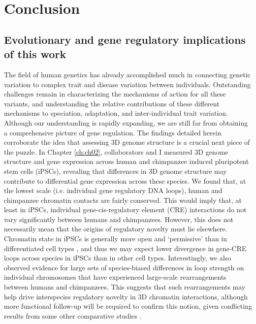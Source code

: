 \chapter{Conclusion}\label{ch:ch04}

\section{Evolutionary and gene regulatory implications of this work}
The field of human genetics has already accomplished much in connecting genetic variation to complex trait and disease variation between individuals. Outstanding challenges remain in characterizing the mechanisms of action for all these variants, and understanding the relative contributions of these different mechanisms to speciation, adaptation, and inter-individual trait variation. Although our understanding is rapidly expanding, we are still far from obtaining a comprehensive picture of gene regulation. The findings detailed herein corroborate the idea that assessing 3D genome structure is a crucial next piece of the puzzle. In Chapter \ref{ch:ch02}, collaborators and I measured 3D genome structure and gene expression across human and chimpanzee induced pluripotent stem cells (iPSCs), revealing that differences in 3D genome structure may contribute to differential gene expression across these species. We found that, at the lowest scale (i.e. individual gene regulatory DNA loops), human and chimpanzee chromatin contacts are fairly conserved. This would imply that, at least in iPSCs, individual gene-cis-regulatory element (CRE) interactions do not vary significantly between humans and chimpanzees. However, this does not necessarily mean that the origins of regulatory novelty must lie elsewhere. Chromatin state in iPSCs is generally more open and `permissive' than in differentiated cell types \cite{Spivakov.2007}, and thus we may expect lower divergence in gene-CRE loops across species in iPSCs than in other cell types. Interestingly, we also observed evidence for large sets of species-biased differences in loop strength on individual chromosomes that have experienced large-scale rearrangements between humans and chimpanzees. This suggests that such rearrangements may help drive interspecies regulatory novelty in 3D chromatin interactions, although more functional follow-up will be required to confirm this notion, given conflicting results from some other comparative studies \cite{Lazar.2018, Krefting.2018}.

